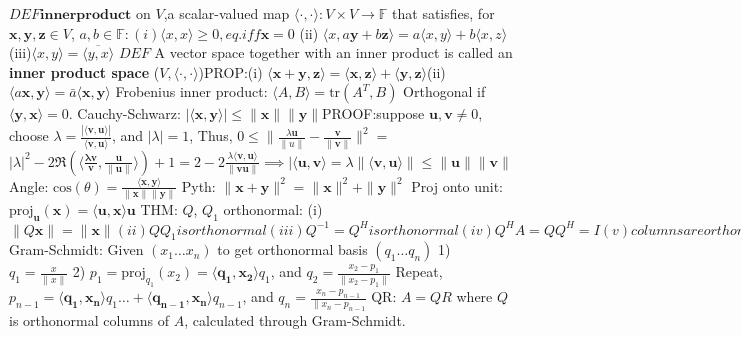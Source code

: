 \documentclass[8pt]{extarticle}
\theoremstyle{definition}
\begin{document}
{\small
$DEF \mathbf{innerproduct}$ on $V$,a scalar-valued map $\langle \cdot,\cdot \rangle: V\times V \to \mathbb{F}$ that satisfies, for $\mathbf{x,y,z} \in V$, $a,b \in \mathbb{F}: (i) \langle x,x \rangle \geq 0, eq. iff \mathbf{x} =0 $
(ii) $\langle x,a \mathbf{y} + b \mathbf{z}  \rangle = a \langle x,y \rangle + b \langle x,z \rangle$
(iii)$ \langle x,y \rangle = \overline { \langle y,x \rangle }$
$DEF$ A vector space together with an inner product is called an \textbf{inner product space} ($V, \langle \cdot,\cdot \rangle$)PROP:(i)
$\langle \mathbf{x + y}, \mathbf{z} \rangle = \langle \mathbf{x}, \mathbf{z} \rangle + \langle \mathbf{y}, \mathbf{z} \rangle 
$(ii)$ \langle a\mathbf{x}, \mathbf{y} \rangle = \bar a \langle \mathbf{x}, \mathbf{y} \rangle $
Frobenius inner product: $\langle A, B \rangle = \text{tr}(A^T,B)$
Orthogonal if $\langle \mathbf{y}, \mathbf{x} \rangle = 0$.
Cauchy-Schwarz: $|\langle \mathbf{x}, \mathbf{y} \rangle | \leq \|\mathbf{x}\| \|\mathbf{y}\|$PROOF:suppose $\mathbf{u}, \mathbf{v} \neq 0$, choose
$\lambda = \frac{|\langle \mathbf{v}, \mathbf{u} \rangle |}{\langle \mathbf{v}, \mathbf{u} \rangle }$, and $|\lambda| = 1$,
Thus, $0 \leq \| \frac{\lambda \mathbf{u}}{\|u\|} - \frac{\mathbf{v}}{\|\mathbf{v}\|}\|^2 = $
$|\lambda|^2 -2 \Re(\langle \mathbf{\frac{\lambda \mathbf{v}}{\mathbf{v}}},
\frac{\mathbf{u}}{\|\mathbf{u}\|} \rangle ) + 1 = 2 - 2 \frac{\lambda \langle \mathbf{v}, \mathbf{u} \rangle }{\|\mathbf{v}\mathbf{u}\|} \implies |\langle \mathbf{u}, \mathbf{v} \rangle 
= \lambda \| \langle \mathbf{v}, \mathbf{u} \rangle \| \leq \|\mathbf{u}\| \| \mathbf{v}\|$ 
Angle: $ \text{cos}(\theta) = \frac{\langle \mathbf{x}, \mathbf{y} \rangle }{\| \mathbf{x}\| \|\mathbf{y}\|}$ 
Pyth: $\|\mathbf{x}+ \mathbf{y}\|^2 = \|\mathbf{x}\|^2 + \|\mathbf{y}\|^2$
Proj onto unit: $\text{proj}_\mathbf{u}(\mathbf{x}) = \langle \mathbf{u}, \mathbf{x} \rangle \mathbf{u}$
THM: $Q$, $Q_1$ orthonormal: (i) $\|Q \mathbf{x}\| = \|\mathbf{x}\| 
(ii) QQ_1 is orthonormal
(iii) Q^{-1} = Q^H is orthonormal
(iv) Q^HA = QQ^H = I
(v) columns are orthonormal
(vi) |det(Q)| = 1$
Gram-Schmidt: Given $(x_1\dots x_n)$ to get orthonormal basis $(q_1 \dots q_n)$ 1) $q_1 = \frac{x}{\|x\|}$ 
2) $p_1 = \text{proj}_{q_1}(x_2) = \langle \mathbf{q_1}, \mathbf{x_2} \rangle q_1$,
and $q_2 = \frac{x_2 - p_1}{\|x_2 - p_1\|}$
Repeat, $p_{n-1} = \langle \mathbf{q_1}, \mathbf{x_n} \rangle q_1 \dots + \langle \mathbf{q_{n-1}}, \mathbf{x_n} \rangle q_{n-1}$, and $ q_n = \frac{x_n - p_{n-1}}{\|x_n - p_{n-1}}$
QR: $A=QR$ where $Q$ is orthonormal columns of $A$, calculated through Gram-Schmidt.
}
\end{document}
